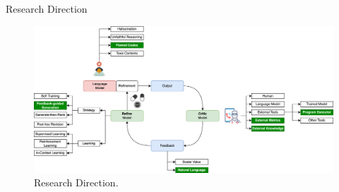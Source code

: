 \begin{frame}{Research Direction}
    \begin{figure}[!htb]
        \centering
        \includegraphics[width=1\textwidth]{img/direction_of_research}
        \captionsetup{font=small,labelformat=empty}
        \caption{Research Direction.}
    \end{figure}
\end{frame}
